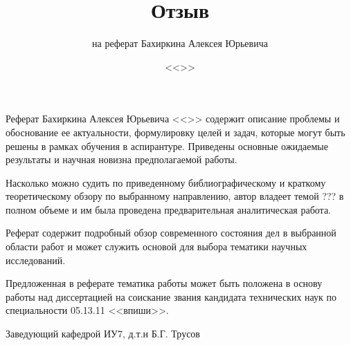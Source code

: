 \documentclass[a4paper,12pt,notitlepage]{article}
\title{Отзыв}
\date{\normalsize{<<>>}}
\author{\small{на реферат Бахиркина Алексея Юрьевича}}
\begin{document}
\maketitle

\vspace{1cm}

\thispagestyle{empty}

Реферат Бахиркина Алексея Юрьевича <<>> содержит описание проблемы и
обоснование ее актуальности, формулировку целей и задач, которые могут быть решены в
рамках обучения в аспирантуре. Приведены основные ожидаемые результаты и научная новизна
предполагаемой работы.

Насколько можно судить по приведенному библиографическому и краткому теоретическому обзору
по выбранному направлению, автор владеет темой ??? в полном
объеме и им была проведена предварительная аналитическая работа.

Реферат содержит подробный обзор современного состояния дел в выбранной области работ и
может служить основой для выбора тематики научных исследований.

Предложенная в реферате тематика работы может быть положена в основу работы над
диссертацией на соискание звания кандидата технических наук по специальности 05.13.11
<<впиши>>.

\vspace{3cm}

\noindent
Заведующий кафедрой ИУ7, д.т.н \hspace{7.5cm}Б.Г. Трусов
\end{document}
